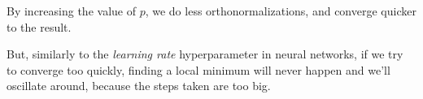 \documentclass{article}
\begin{document}
By increasing the value of $p$, we do less orthonormalizations, and converge quicker to the result.

But, similarly to the \emph{learning rate} hyperparameter in neural networks, if we try to converge too quickly, finding a local minimum will never happen and we'll oscillate around, because the steps taken are too big.
\end{document}
